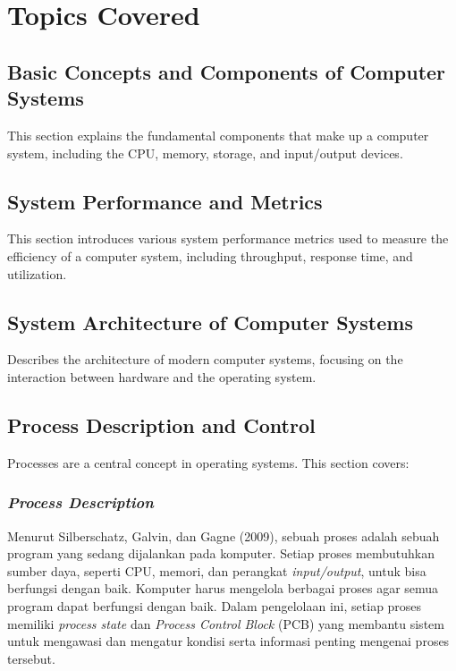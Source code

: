 \documentclass[12pt]{article}
\begin{document}
\section{Topics Covered}

\subsection{Basic Concepts and Components of Computer Systems}
This section explains the fundamental components that make up a computer system, including the CPU, memory, storage, and input/output devices.

\subsection{System Performance and Metrics}
This section introduces various system performance metrics used to measure the efficiency of a computer system, including throughput, response time, and utilization.

\subsection{System Architecture of Computer Systems}
Describes the architecture of modern computer systems, focusing on the interaction between hardware and the operating system.

\subsection{Process Description and Control}
Processes are a central concept in operating systems. This section covers:
    \subsubsection{\textit{Process Description}}
    Menurut Silberschatz, Galvin, dan Gagne (2009), sebuah proses adalah sebuah program yang sedang dijalankan pada komputer. Setiap proses membutuhkan sumber daya, seperti CPU, memori, dan perangkat \textit{input/output}, untuk bisa berfungsi dengan baik. Komputer harus mengelola berbagai proses agar semua program dapat berfungsi dengan baik. Dalam pengelolaan ini, setiap proses memiliki \textit{process state} dan \textit{Process Control Block} (PCB) yang membantu sistem untuk mengawasi dan mengatur kondisi serta informasi penting mengenai proses tersebut.
\end{document}
